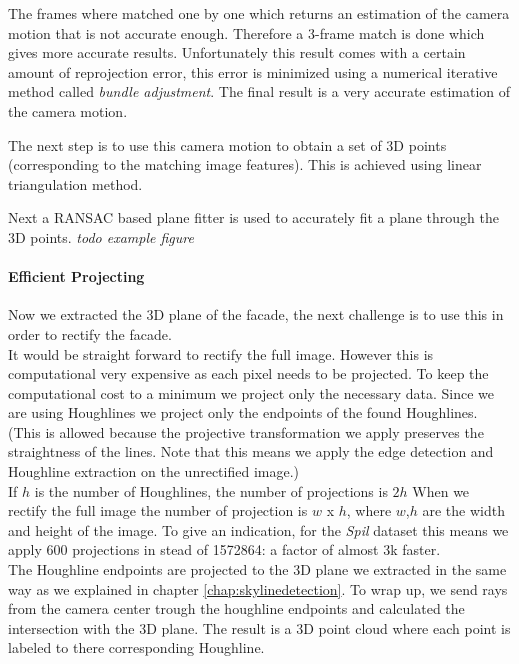 The frames where matched one by one which returns an estimation of the camera
motion that is not accurate enough.  Therefore a 3-frame match is done which
gives more accurate results.  Unfortunately this result comes with a certain
amount of reprojection error, this error is minimized using a numerical
iterative method called \emph{bundle adjustment}.  The final result is a very
accurate estimation of the camera motion.

The next step is to use this camera motion to obtain a set of 3D points
(corresponding to the matching image features).  This is achieved using linear triangulation
method. 

Next a RANSAC based plane fitter is used to accurately fit a plane through
the 3D points. 
\emph{todo example figure}

\paragraph{Efficient Projecting} 
Now we extracted the 3D plane of the facade, the next challenge is to use this in order to rectify the facade.\\

It would be straight forward to rectify the full image. However this is
computational very expensive as each pixel needs to be projected. To keep the
computational cost to a minimum we project only the necessary data. Since we
are using Houghlines we project only the endpoints of the found Houghlines. 
(This is allowed because the projective transformation we apply preserves the
straightness of the lines. Note that this means we apply the edge detection and
Houghline extraction on the unrectified image.)\\

If $h$ is the number of Houghlines, the number of projections is $2h$
When we rectify the full image the number of projection is $w$ x $h$, where $w$,$h$ are the width and height of
the image. To give an indication, for the \emph{Spil} dataset %
this means we apply 600 projections in stead of 1572864: a factor of almost 3k faster.\\


The Houghline endpoints are projected to the 3D plane we extracted in the same
way as we explained in chapter \ref{chap:skylinedetection}. To wrap up, we send
rays from the camera center trough the houghline endpoints and calculated the
intersection with the 3D plane.  The result is a 3D point cloud where each
point is labeled to there corresponding Houghline.\\

